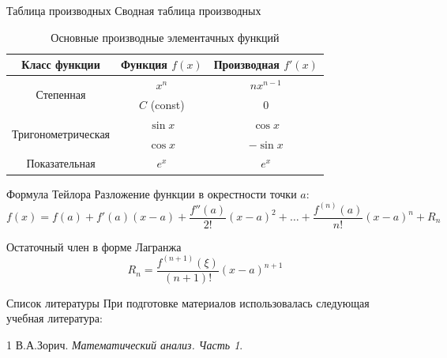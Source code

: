 \documentclass{beamer}
\begin{document}
\begin{frame}{Таблица производных}
Сводная таблица производных

\begin{table}
\centering
\small
\begin{tabular}{|c|c|c|}
\hline
\textbf{Класс функции} & \textbf{Функция $f(x)$} & \textbf{Производная $f'(x)$} \\
\hline
\multirow{2}{*}{Степенная} & $x^n$ & $n x^{n-1}$ \\
\cline{2-3}
 & $C$ (const) & $0$ \\
\hline
\multirow{2}{*}{Тригонометрическая} & $\sin x$ & $\cos x$ \\
\cline{2-3}
 & $\cos x$ & $-\sin x$ \\
\hline
Показательная & $e^x$ & $e^x$ \\
\hline
\end{tabular}
\caption{Основные производные элементачных функций}
\end{table}
\end{frame}


\begin{frame}{Формула Тейлора}
Разложение функции в окрестности точки $a$:
\begin{equation*}
f(x) = f(a) + f'(a)(x-a) + \frac{f''(a)}{2!}(x-a)^2 + \dots + \frac{f^{(n)}(a)}{n!}(x-a)^n + R_n
\end{equation*}

\begin{block}{Остаточный член в форме Лагранжа}
\begin{equation*}
R_n = \frac{f^{(n+1)}(\xi)}{(n+1)!}(x-a)^{n+1}
\end{equation*}
\end{block}
\end{frame}


\begin{frame}{Список литературы}
При подготовке материалов использовалась следующая учебная литература:

\begin{thebibliography}{1}
В.А.Зорич.
\textit{Математический анализ. Часть 1}.
\end{thebibliography}
\end{frame}
\end{document}
